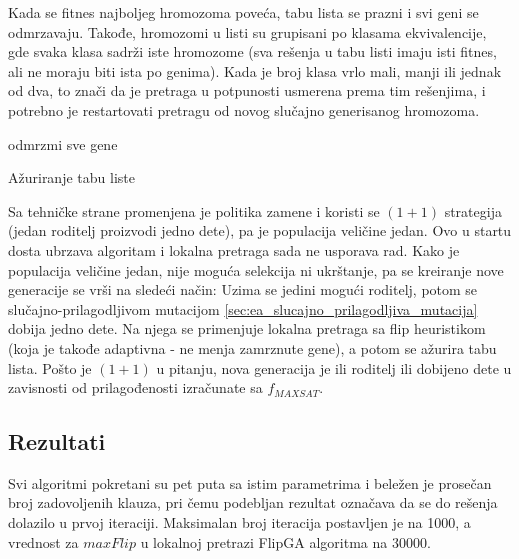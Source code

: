 \documentclass[a4paper]{article}
\begin{document}
Kada se fitnes najboljeg hromozoma poveća, tabu lista se prazni i svi geni se odmrzavaju.
Takođe, hromozomi u listi su grupisani po klasama ekvivalencije, gde svaka klasa sadrži
iste hromozome (sva rešenja u tabu listi imaju isti fitnes, 
ali ne moraju biti ista po genima). Kada je broj klasa vrlo mali, manji ili jednak od dva,
to znači da je pretraga u potpunosti usmerena prema tim rešenjima, i potrebno je restartovati
pretragu od novog slučajno generisanog hromozoma. \\

\begin{algorithm}[H]
\SetAlgoLined
{}

\BlankLine
 odmrzmi sve gene\;
 \caption{Ažuriranje tabu liste}
\end{algorithm}

Sa tehničke strane promenjena je politika zamene i koristi se $(1+1)$ strategija 
(jedan roditelj proizvodi jedno dete), pa je populacija veličine jedan. Ovo u startu dosta
ubrzava algoritam i lokalna pretraga sada ne usporava rad.
Kako je populacija veličine jedan, nije moguća selekcija ni ukrštanje, 
pa se kreiranje nove generacije se vrši na sledeći način: 
Uzima se jedini mogući roditelj, potom se slučajno-prilagodljivom mutacijom
\ref{sec:ea_slucajno_prilagodljiva_mutacija} dobija jedno dete. 
Na njega se primenjuje lokalna pretraga sa flip heuristikom (koja je takođe adaptivna - 
ne menja zamrznute gene), a potom se ažurira tabu lista.
Pošto je $(1+1)$ u pitanju, nova generacija je ili roditelj ili dobijeno dete 
u zavisnosti od prilagođenosti izračunate sa $f_{MAXSAT}$.



\subsection{Rezultati}
\label{sec:ea_rezultati}
Svi algoritmi pokretani su pet puta sa istim parametrima i beležen je prosečan broj
zadovoljenih klauza, pri čemu podebljan rezultat označava da se do rešenja 
dolazilo u prvoj iteraciji. Maksimalan broj iteracija postavljen je na 1000, a vrednost
za $maxFlip$ u lokalnoj pretrazi FlipGA algoritma na 30000.\\
\end{document}

